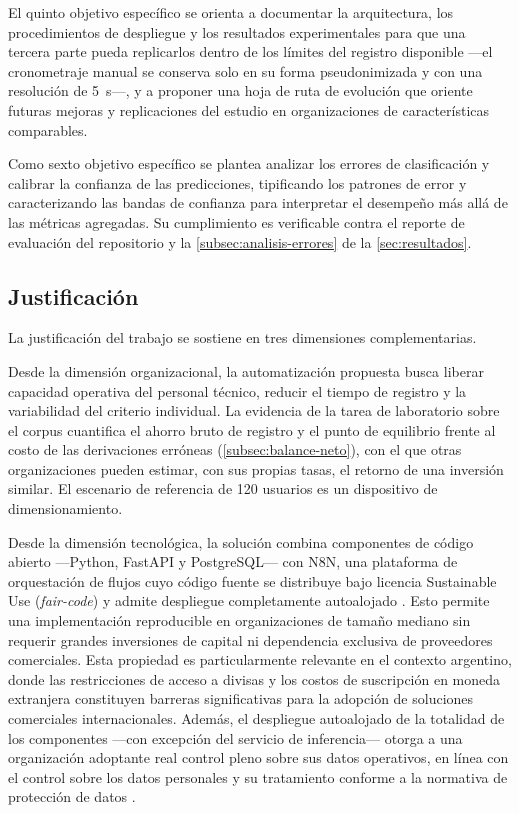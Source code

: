 El quinto objetivo específico se orienta a documentar la arquitectura, los procedimientos de despliegue y los resultados experimentales para que una tercera parte pueda replicarlos dentro de los límites del registro disponible ---el cronometraje manual se conserva solo en su forma pseudonimizada y con una resolución de 5~s---, y a proponer una hoja de ruta de evolución que oriente futuras mejoras y replicaciones del estudio en organizaciones de características comparables.

Como sexto objetivo específico se plantea analizar los errores de clasificación y calibrar la confianza de las predicciones, tipificando los patrones de error y caracterizando las bandas de confianza para interpretar el desempeño más allá de las métricas agregadas. Su cumplimiento es verificable contra el reporte de evaluación del repositorio y la \autoref{subsec:analisis-errores} de la \autoref{sec:resultados}.

\subsection{Justificación}\label{subsec:justificacion}

La justificación del trabajo se sostiene en tres dimensiones complementarias.

Desde la dimensión organizacional, la automatización propuesta busca liberar capacidad operativa del personal técnico, reducir el tiempo de registro y la variabilidad del criterio individual. La evidencia de la tarea de laboratorio sobre el corpus cuantifica el ahorro bruto de registro y el punto de equilibrio frente al costo de las derivaciones erróneas (\autoref{subsec:balance-neto}), con el que otras organizaciones pueden estimar, con sus propias tasas, el retorno de una inversión similar. El escenario de referencia de 120 usuarios es un dispositivo de dimensionamiento.

Desde la dimensión tecnológica, la solución combina componentes de código abierto ---Python, FastAPI y PostgreSQL--- con N8N, una plataforma de orquestación de flujos cuyo código fuente se distribuye bajo licencia Sustainable Use (\emph{fair-code}) y admite despliegue completamente autoalojado \parencite{n8n2024_docs}. Esto permite una implementación reproducible en organizaciones de tamaño mediano sin requerir grandes inversiones de capital ni dependencia exclusiva de proveedores comerciales. Esta propiedad es particularmente relevante en el contexto argentino, donde las restricciones de acceso a divisas y los costos de suscripción en moneda extranjera constituyen barreras significativas para la adopción de soluciones comerciales internacionales. Además, el despliegue autoalojado de la totalidad de los componentes ---con excepción del servicio de inferencia--- otorga a una organización adoptante real control pleno sobre sus datos operativos, en línea con el control sobre los datos personales y su tratamiento conforme a la normativa de protección de datos \parencite{Ley25326_2000}.

